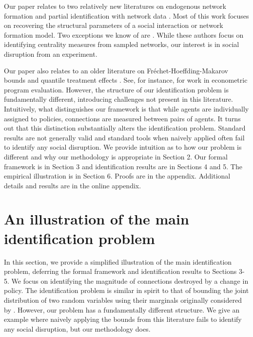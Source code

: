 \documentclass[12pt]{article}
\theoremstyle{definition}
\begin{document}
Our paper relates to two relatively new literatures on endogenous network formation and partial identification with network data \cite[see, broadly, reviews by][]{de2016econometrics,bramoulle2020peer,graham2020network,molinari2020microeconometrics}. Most of this work focuses on recovering the structural parameters of a social interaction or network formation model. Two exceptions we know of are \cite{chandrasekhar2011econometrics,thirkettle2019identification}. While these authors focus on identifying centrality measures from sampled networks, our interest is in social disruption from an experiment.   

Our paper also relates to an older literature on Fr\'echet-Hoeffding-Makarov bounds \citep{hoeffding1940masstabinvariante,frechet1951tableaux,makarov1982estimates} and quantile treatment effects \citep{doksum1974empirical,lehmann1975nonparametrics,whitt1976bivariate}. See, for instance, \cite{manski1997mixing,manski2003partial,heckman1997making,bitler2006mean,firpo2007efficient,fan2010sharp,tamer2010partial,abadie2018econometric,masten2018identification,masten2020inference,firpo2019partial,frandsen2021partial} for work in econometric program evaluation. However, the structure of our identification problem is fundamentally different, introducing challenges not present in this literature. Intuitively, what distinguishes our framework is that while agents are individually assigned to policies, connections are measured between pairs of agents. It turns out that this distinction substantially alters the identification problem. Standard results are not generally valid and standard tools when naively applied often fail to identify any social disruption. We provide intuition as to how our problem is different and why our methodology is appropriate in Section 2. Our formal framework is in Section 3 and identification results are in Sections 4 and 5. The empirical illustration is in Section 6. Proofs are in the appendix. Additional details and results are in the online appendix.    


\section{An illustration of the main identification problem}
In this section, we provide a simplified illustration of the main identification problem, deferring the formal framework and identification results to Sections 3-5. We focus on identifying the magnitude of connections destroyed by a change in policy. The identification problem is similar in spirit to that of bounding the joint distribution of two random variables using their marginals originally considered by \cite{hoeffding1940masstabinvariante,frechet1951tableaux}. However, our problem has a fundamentally different structure. We give an example where naively applying the bounds from this literature fails to identify any social disruption, but our methodology does.   
\end{document}
